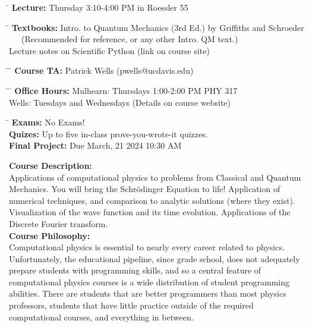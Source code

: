 \documentclass[12pt]{article}
\begin{document}
\noindent
\begin{tabbing}
\hspace*{8em} \= \kill 
\textbf {Lecture:} \> Thursday 3:10-4:00 PM in Roessler 55 
\end{tabbing}
\noindent
\begin{tabbing}
\hspace*{8em} \= \kill 
\textbf{Textbooks:} \> Intro. to Quantum Mechanics (3rd Ed.) by Griffiths and Schroeder\\
\> ~~~(Recommended for reference, or any other Intro. QM text.)\\
\> Lecture notes on Scientific Python (link on course site)\\
\end{tabbing}
\noindent
\begin{tabbing}
\hspace*{8em}\= \hspace*{10em} \= \kill 
\textbf{Course TA:} \> Patrick Wells \> (pwells@ucdavis.edu)
\end{tabbing}
\noindent
\begin{tabbing}
\hspace*{8em}\= \hspace*{10em} \= \kill 
\textbf{Office Hours:}
    \> Mulhearn: \> Thursdays 1:00-2:00 PM PHY 317\\
    \> Wells: \> Tuesdays and Wednesdays (Details on course website)
\end{tabbing}
\noindent
\begin{tabbing}
\hspace*{12em}\= \kill 
\textbf{Exams:} \> No Exams!\\
\textbf{Quizes:} \> Up to five in-class prove-you-wrote-it quizzes.\\
\textbf{Final Project:} \> Due March, 21 2024 10:30 AM \\
\end{tabbing}
\noindent
\textbf {Course Description:}\\
Applications of computational physics to problems from Classical and Quantum Mechanics.
You will bring the Schr\"odinger Equation to life!  Application of numerical techniques, and comparison to analytic solutions (where they exist).  Visualization of the wave function and its time evolution.  Applications of the Discrete Fourier transform.\\[8pt]
\noindent
\textbf {Course Philosophy:}\\
Computational physics is essential to nearly every career related to physics.  Unfortunately, the educational pipeline, since grade school, does not adequately prepare students with programming skills, and so a central feature of computational physics courses is a wide distribution of student programming abilities.  There are students that are better programmers than most physics professors, students that have little practice outside of the required computational courses, and everything in between.
\end{document}
